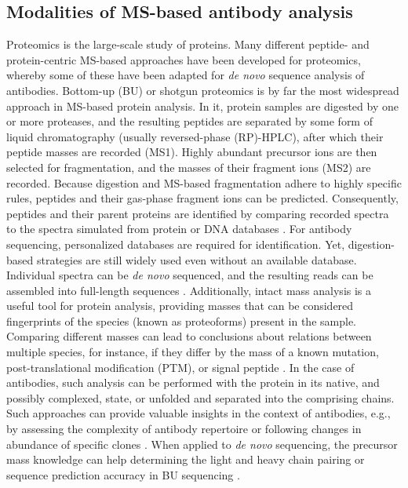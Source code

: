 \subsection{Modalities of MS-based antibody analysis}
Proteomics is the large-scale study of proteins. Many different peptide- and protein-centric MS-based approaches have been developed for proteomics, whereby some of these have been adapted for \emph{de novo} sequence analysis of antibodies.
Bottom-up (BU) or shotgun proteomics is by far the most widespread approach in MS-based protein analysis. In it, protein samples are digested by one or more proteases, and the resulting peptides are separated by some form of liquid chromatography (usually reversed-phase (RP)-HPLC), after which their peptide masses are recorded (MS1). Highly abundant precursor ions are then selected for fragmentation, and the masses of their fragment ions (MS2) are recorded.
Because digestion and MS-based fragmentation adhere to highly specific rules, peptides and their gas-phase fragment ions can be predicted. Consequently, peptides and their parent proteins are identified by comparing recorded spectra to the spectra simulated from protein or DNA databases \cite{aebersold2003mass}. For antibody sequencing, personalized databases are required for identification. Yet, digestion-based strategies are still widely used even without an available database. Individual spectra can be \emph{de novo} sequenced, and the resulting reads can be assembled into full-length sequences \cite{tran2016complete, guthals2012shotgun, sen2017automated}.
Additionally, intact mass analysis is a useful tool for protein analysis, providing masses that can be considered fingerprints of the species (known as proteoforms) present in the sample. Comparing different masses can lead to conclusions about relations between multiple species, for instance, if they differ by the mass of a known mutation, post-translational modification (PTM), or signal peptide \cite{donnelly2019best}. In the case of antibodies, such analysis can be performed with the protein in its native, and possibly complexed, state, or unfolded and separated into the comprising chains. Such approaches can provide valuable insights in the context of antibodies, e.g., by assessing the complexity of antibody repertoire or following changes in abundance of specific clones \cite{bondt2021human}. When applied to \emph{de novo} sequencing, the precursor mass knowledge can help determining the light and heavy chain pairing or sequence prediction accuracy in BU sequencing \cite{guthals2017de}.

